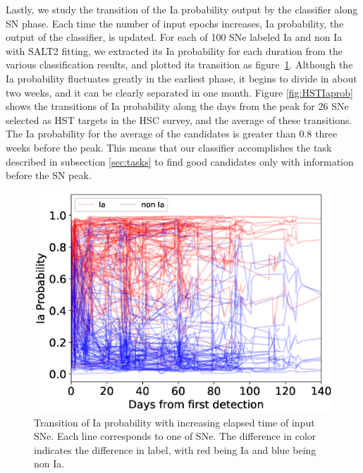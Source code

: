 \documentclass[proof]{pasj01}
\begin{document}
Lastly, we study the transition of the Ia probability output by the classifier along SN phase.
Each time the number of input epochs increases, Ia probability, the output of the classifier, is updated.
For each of 100 SNe labeled Ia and non Ia with SALT2 fitting, we extracted its Ia probability for each duration from the various classification results, and plotted its transition as figure\ \ref{fig:visualized_Ia_prob}.
Although the Ia probability fluctuates greatly in the earliest phase, it begins to divide in about two weeks, and it can be clearly separated in one month.
Figure \ref{fig:HSTIaprob} shows the transitions of Ia probability along the days from the peak for 26 SNe selected as HST targets in the HSC survey, and the average of these transitions.
The Ia probability for the average of the candidates is greater than 0.8 three weeks before the peak.
This means that our classifier accomplishes the task described in subsection \ref{sec:tasks} to find good candidates only with information before the SN peak.
%
\begin{figure}[htbp]
  \begin{center}
     \includegraphics[width=\columnwidth]{figures/n_observations_visualized_Ia_probability_200319.eps}
  \end{center}
  \caption{%
  Transition of Ia probability with increasing elapsed time of input SNe.
  Each line corresponds to one of SNe.
  The difference in color indicates the difference in label, with red being Ia and blue being non Ia.
  }%
  \label{fig:visualized_Ia_prob}
\end{figure}
\end{document}
